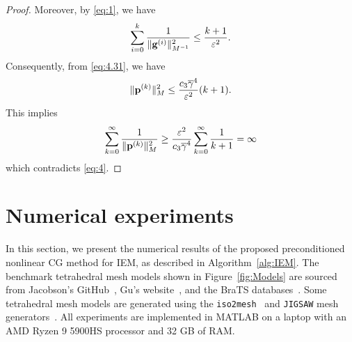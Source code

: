 \documentclass[11pt,a4paper]{article}
\begin{document}
\begin{proof}
Moreover, by \eqref{eq:1}, we have
\begin{equation}
\sum_{i=0}^k \frac{1}{\| \mathbf{g}^{(i)} \|^2_{M^{-1}}}  \leq  \frac{k+1 }{\varepsilon^2}.
\label{eq:4.32}
\end{equation}
Consequently, from \eqref{eq:4.31}, we have
\begin{equation*}
\| \mathbf{p}^{(k)} \|^2_{M} \leq \frac{c_3 \overline{\gamma}^4}{\varepsilon^2} (k+1).
\end{equation*}
This implies
\[
\sum_{k=0}^{\infty} \frac{1}{\| \mathbf{p}^{(k)} \|^2_{M}} \geq \frac{\varepsilon^2}{c_3 \overline{\gamma}^4} \sum_{k=0}^{\infty} \frac{1}{k+1} = \infty
\]
which contradicts \eqref{eq:4}.
\end{proof}








\section{Numerical experiments}
\label{sec:6}

In this section, we present the numerical results of the proposed preconditioned nonlinear CG method for IEM, as described in Algorithm~\ref{alg:IEM}. The benchmark tetrahedral mesh models shown in Figure~\ref{fig:Models} are sourced from Jacobson's GitHub~\cite{Jacobson}, Gu's website~\cite{GuOMT}, and the BraTS databases~\cite{BaGB21,BaAS17}. 
Some tetrahedral mesh models are generated using the \texttt{iso2mesh}~\cite{FaBo09,TrYF20} and \texttt{JIGSAW} mesh generators~\cite{Engw14,Engw15,Engw16,EnIv14,EnIv16}. All experiments are implemented in MATLAB on a laptop with an AMD Ryzen 9 5900HS processor and 32 GB of RAM.
\end{document}
